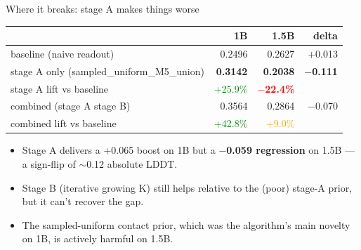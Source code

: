 \documentclass[aspectratio=169,11pt]{beamer}
\begin{document}
\begin{frame}{Where it breaks: stage A makes things worse}
  \begin{center}
    \begin{tabular}{lrrr}
      \toprule
       & 1B & 1.5B & delta\\
      \midrule
      baseline (naive readout)       & 0.2496 & 0.2627 & +0.013 \\
      stage A only (sampled\_uniform\_M5\_union) & \textbf{0.3142} & \textbf{0.2038} & \textbf{$-$0.111} \\
      stage A lift vs baseline       & \textcolor{green}{+25.9\%} & \textcolor{red}{\textbf{$-$22.4\%}} & \\
      \midrule
      combined (stage A \textrightarrow{} stage B) & 0.3564 & 0.2864 & $-$0.070 \\
      combined lift vs baseline      & \textcolor{green}{+42.8\%} & \textcolor{orange}{+9.0\%} & \\
      \bottomrule
    \end{tabular}
  \end{center}
  \vspace{0.6em}
  \begin{itemize}
    \setlength\itemsep{0.2em}
    \item Stage A delivers a +0.065 boost on 1B but a \textbf{$-$0.059
          regression} on 1.5B — a sign-flip of $\sim$0.12 absolute LDDT.
    \item Stage B (iterative growing K) still helps relative to the
          (poor) stage-A prior, but it can't recover the gap.
    \item The sampled-uniform contact prior, which was the
          algorithm's main novelty on 1B, is actively harmful on 1.5B.
  \end{itemize}
\end{frame}
\end{document}
